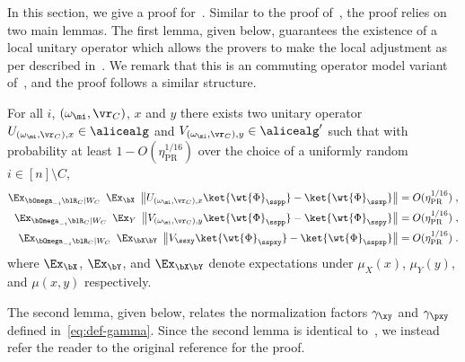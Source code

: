 In this section, we give a proof for~. Similar to the proof of~\cite[Proposition 5.1]{bavarianAnchoredParallelRepetition2021}, the proof relies on two main lemmas. The first lemma, given below, guarantees the existence of a local unitary operator which allows the provers to make the local adjustment as per described in~. We remark that this is an commuting operator model variant of~\cite[Proposition 5.1]{bavarianAnchoredParallelRepetition2021}, and the proof follows a similar structure. 
\begin{lemma}
	\label{lem:unitary_bounds}
	For all $i$, $(\omega_{\mi}, \vr_C)$, $x$ and $y$ there exists two unitary operator $U_{(\omega_{\mi}, \vr_C), x} \in \alicealg$ and $V_{(\omega_{\mi}, \vr_C), y} \in  \alicealg'$ such that with probability at least $1 - O(\eta_{\text{PR}}^{1/16})$ over the choice of a uniformly random $i \in [n] \setminus C$, 
	\begin{align}
	\Ex_{\bOmega_{-i} \blR_C |  W_C} \, \, \, \Ex_{\bX} \, \, \, \big \|U_{(\omega_{\mi}, \vr_C), x}  \ket{\wt{\Phi}_\sspp} - \ket{\wt{\Phi}_\ssxp }   \big \| &=  O(\eta_{\text{PR}}^{1/16})\;,\label{eq:ux_bound}\\
 	\Ex_{\bOmega_{-i} \blR_C |  W_C} \, \, \, \Ex_{Y} \, \, \, \big \| V_{(\omega_{\mi}, \vr_C),y}  \ket{\wt{\Phi}_\sspp}  - \ket{\wt{\Phi}_\sspy }  \big \| &=  O(\eta_{\text{PR}}^{1/16})\;,\label{eq:vy_bound}\\
	\Ex_{\bOmega_{-i} \blR_C |  W_C} \, \, \, \Ex_{\bX \bY}  \,\, \, \big \| V_{\ssxy}  \ket{\wt{\Phi}_\sspxy}  - \ket{\wt{\Phi}_\sspxp }  \big \| &=  O(\eta_{\text{PR}}^{1/16})\;.\label{eq:vxy_bound}
	\end{align}
	where $\Ex_{\bX}$, $\Ex_{\bY}$, and $\Ex_{\bX \bY}$ denote expectations under $\mu_X(x)$, $\mu_Y(y)$, and $\mu(x,y)$ respectively.
\end{lemma}
The second lemma, given below, relates the normalization factors $\gamma_\xy$ and $\gamma_{\pxy}$ defined in~\eqref{eq:def-gamma}. Since the second lemma is identical to~\cite[Lemma 5.17]{bavarianAnchoredParallelRepetition2021}, we instead refer the reader to the original reference for the proof. 

